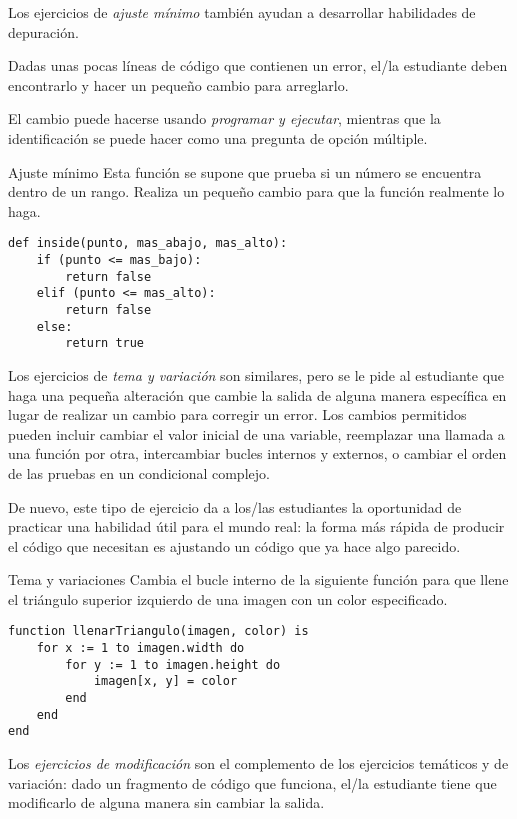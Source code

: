 Los ejercicios de \emph{ajuste mínimo} también ayudan a desarrollar habilidades de depuración.

Dadas unas pocas líneas de código que contienen un error, el/la estudiante deben encontrarlo y hacer un pequeño cambio para arreglarlo.

El cambio puede hacerse usando \emph{programar y ejecutar},
mientras que la identificación se puede hacer como una pregunta de opción múltiple.


\begin{aside}{Ajuste mínimo}
 Esta función se supone que prueba 
 si un número se encuentra dentro de un rango.
 Realiza un pequeño cambio para que la función realmente lo haga.

\begin{verbatim}
def inside(punto, mas_abajo, mas_alto):
    if (punto <= mas_bajo):
        return false
    elif (punto <= mas_alto):
        return false
    else:
        return true
\end{verbatim}
\end{aside}

Los ejercicios de \emph{tema y variación} son similares, 
pero se le pide al estudiante que haga una pequeña alteración que cambie la salida de alguna manera específica 
en lugar de realizar un cambio para corregir un error.
Los cambios permitidos pueden incluir cambiar el valor inicial de una variable, 
reemplazar una llamada a una función por otra, 
intercambiar bucles internos y externos,
o cambiar el orden de las pruebas en un condicional complejo.

De nuevo,
este tipo de ejercicio da a los/las estudiantes la oportunidad de practicar una habilidad útil para el mundo real:
la forma más rápida de producir el código que necesitan 
es ajustando un código que ya hace algo parecido.

\begin{aside}{Tema y variaciones}
  Cambia el bucle interno de la siguiente 
  función para que llene el triángulo superior izquierdo de una imagen
  con un color especificado.

\begin{verbatim}
function llenarTriangulo(imagen, color) is
    for x := 1 to imagen.width do
        for y := 1 to imagen.height do
            imagen[x, y] = color
        end
    end
end
\end{verbatim}
\end{aside}

Los \emph{ejercicios de modificación} son el complemento de los ejercicios temáticos y de variación: 
dado un fragmento de código que funciona, el/la estudiante tiene que modificarlo de alguna manera sin cambiar la salida.

